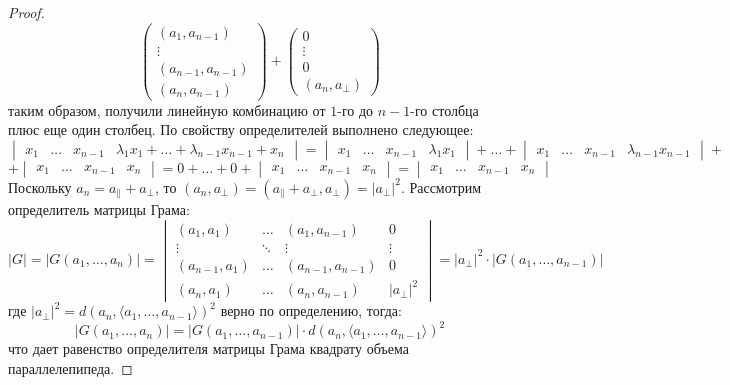 \documentclass[12pt]{article}
\theoremstyle{definition}
\begin{document}
\begin{proof}
$$\begin{pmatrix}
			(a_1, a_{n-1})\\
			\vdots\\
			(a_{n-1},a_{n-1})\\
			(a_n, a_{n-1})
		\end{pmatrix} + 
		\begin{pmatrix}
			0 \\
			\vdots\\
			0 \\
			(a_n, a_\bot)
		\end{pmatrix}
	$$
	таким образом, получили линейную комбинацию от $1$-го до $n-1$-го столбца плюс еще один столбец. По свойству определителей выполнено следующее:
	$$
		\begin{vmatrix}
			x_1 & \dotsc & x_{n-1} & \lambda_1 x_1 + \dotsc + \lambda_{n-1} x_{n-1} + x_n
		\end{vmatrix} = 
		\begin{vmatrix}
			x_1 & \dotsc & x_{n-1} & \lambda_1 x_1 
		\end{vmatrix} + \dotsc + 
		\begin{vmatrix}
			x_1 & \dotsc & x_{n-1} & \lambda_{n-1} x_{n-1} 
		\end{vmatrix} + 
	$$	
	$$
		+
		\begin{vmatrix}
			x_1 & \dotsc & x_{n-1} & x_n
		\end{vmatrix} = 0 + \dotsc + 0 + 
		\begin{vmatrix}
			x_1 & \dotsc & x_{n-1} & x_n
		\end{vmatrix} = 
		\begin{vmatrix}
			x_1 & \dotsc & x_{n-1} & x_n
		\end{vmatrix}
	$$
	Поскольку $a_n = a_{\|} + a_{\bot}$, то $(a_n, a_\bot) = (a_{\|} + a_\bot, a_\bot) = |a_\bot|^2$. Рассмотрим определитель матрицы Грама:
	$$
		|G| = |G(a_1, \dotsc, a_n)| = 
		\begin{vmatrix}
			(a_1,a_1) & \dotsc & (a_1, a_{n-1}) & 0 \\
			\vdots & \ddots & \vdots & \vdots \\
			(a_{n-1},a_1) & \dotsc & (a_{n-1}, a_{n-1}) & 0\\
			(a_n, a_1) & \dotsc & (a_n, a_{n-1}) & |a_\bot|^2
		\end{vmatrix} = |a_\bot|^2{\cdot}|G(a_1, \dotsc, a_{n-1})|
	$$
	где $|a_\bot|^2 = d(a_n, \langle a_1, \dotsc, a_{n-1}\rangle)^2$ верно по определению, тогда: 
	$$
		|G(a_1,\dotsc, a_n)| = |G(a_1,\dotsc, a_{n-1})|{\cdot}d(a_n, \langle a_1, \dotsc, a_{n-1}\rangle)^2
	$$
	что дает равенство определителя матрицы Грама квадрату объема параллелепипеда.
\end{proof}
\end{document}
